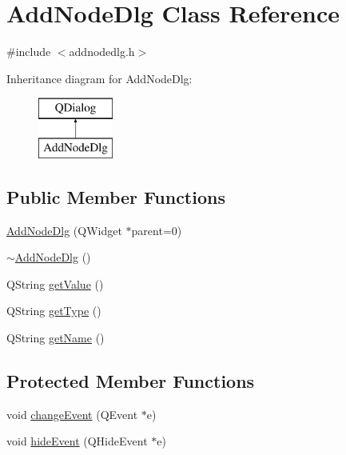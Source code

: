 \hypertarget{class_add_node_dlg}{}\section{Add\+Node\+Dlg Class Reference}
\label{class_add_node_dlg}


{\ttfamily \#include $<$addnodedlg.\+h$>$}

Inheritance diagram for Add\+Node\+Dlg\+:\begin{figure}[H]
\begin{center}
\leavevmode
\includegraphics[height=2.000000cm]{class_add_node_dlg}
\end{center}
\end{figure}
\subsection*{Public Member Functions}
\begin{DoxyCompactItemize}
\item 
\hyperlink{class_add_node_dlg_a4ec72774fa593b3478b30b93fc6bc66e}{Add\+Node\+Dlg} (Q\+Widget $\ast$parent=0)
\item 
\hyperlink{class_add_node_dlg_ac8fbcff62ff505714198a9318eca0c0f}{$\sim$\+Add\+Node\+Dlg} ()
\item 
Q\+String \hyperlink{class_add_node_dlg_a68b5c4fdf57e5fd7545df5b6f1dfbccd}{get\+Value} ()
\item 
Q\+String \hyperlink{class_add_node_dlg_a71a6ea544a25bea1ab8d540f7ad72629}{get\+Type} ()
\item 
Q\+String \hyperlink{class_add_node_dlg_aa57ccdcce3ed1af8633a44ddb5048595}{get\+Name} ()
\end{DoxyCompactItemize}
\subsection*{Protected Member Functions}
\begin{DoxyCompactItemize}
\item 
void \hyperlink{class_add_node_dlg_a950d325bb996a975c520cf18ddc1950d}{change\+Event} (Q\+Event $\ast$e)
\item 
void \hyperlink{class_add_node_dlg_a1f953c07a5711c3064c73d627910e273}{hide\+Event} (Q\+Hide\+Event $\ast$e)
\end{DoxyCompactItemize}


